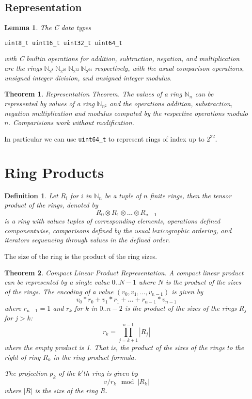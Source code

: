\documentclass{article}
\newtheorem{theorem}{Theorem}
\newtheorem{lemma}{Lemma}
\newtheorem{definition}{Definition}
\begin{document}
\subsection{Representation}
\begin{lemma} The C data types
\begin{verbatim}
uint8_t uint16_t uint32_t uint64_t
\end{verbatim}
with C builtin operations for addition, subtraction, negation, and multiplication
are the rings
\(\mathbb{N}_{2^8}\ \mathbb{N}_{2^{16}}\ \mathbb{N}_{2^{32}}\ \mathbb{N}_{2^{64}} \)
respectively, with the usual comparison operations, unsigned integer division,
and unsigned integer modulus.
\end{lemma}

\begin{theorem}
{\em Representation Theorem}. The values of a ring $\mathbb{N}_n$ can be represented
by values of a ring $\mathbb{N}_{n^2}$ and the operations addition, substraction, negation
multiplication and modulus computed by the respective operations modulo $n$. Comparisions
work without modification.
\end{theorem}
In particular we can use \verb$uint64_t$ to represent rings of index up to 
$2^{32}$.

\section{Ring Products}
\begin{definition}
Let $R_i$ for $i$ in $\mathbb{N}_n$ be a tuple of $n$ finite rings, then the
{\em tensor product} of the rings, denoted by
$$R_0 \otimes R_1 \otimes ... \otimes R_{n-1}$$
is a ring with values tuples of corresponding elements, operations
defined componentwise, comparisons defined by the usual lexicographic
ordering, and iterators sequencing through values in the defined order.
\end{definition}
The size of the ring is the product of the ring sizes.

\begin{theorem} {\em Compact Linear Product Representation}.
A compact linear product can be represented by a single value
$0..{N-1}$ where $N$ is the product of the sizes of the rings.
The encoding of a value $(v_0, v_1, ... ,v_{n-1})$ is given by
$$v_0 * r_0 + v_1 * r_1 + ... + r_{n-1} * v_{n-1}$$
where $r_{n-1}=1$ and $r_k$ for $k$ in $0..n-2$ is the product of the sizes of the rings
$R_j$ for $j>k$:
$$r_k = \prod_{j=k+1}^{n-1} |R_j|$$
where the empty product is 1. That is, the product of the sizes of the rings
to the {\em right} of ring $R_k$ in the ring product formula.

The projection $p_k$ of the $k'th$ ring is given by $$v / r_k \mod |R_k|$$
where $|R|$ is the size of the ring $R$.
\end{theorem}
\end{document}
